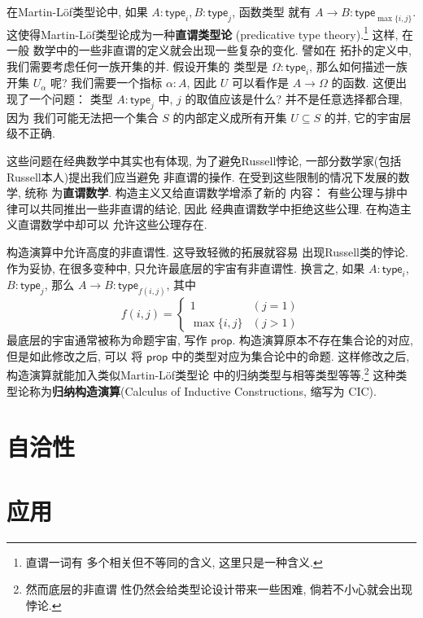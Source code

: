 \documentclass[UTF8]{ctexbook}
\newcommand{\cons}[1]{\textsf{#1}}
\theoremstyle{plain}
\theoremstyle{definition}
\theoremstyle{remark}
\begin{document}
在Martin-L\"of类型论中, 如果
\(A : \cons{type}_i, B : \cons{type}_j\), 函数类型
就有 \(A \to B : \cons{type}_{\max\{i,j\}}\).
这使得Martin-L\"of类型论成为一种\textbf{直谓类型论}
(predicative type theory).\footnote{直谓一词有
多个相关但不等同的含义, 这里只是一种含义.} 这样, 在一般
数学中的一些非直谓的定义就会出现一些复杂的变化. 譬如在
拓扑的定义中, 我们需要考虑任何一族开集的并. 假设开集的
类型是 \(\Omega : \cons{type}_i\), 那么如何描述一族
开集 \(U_\alpha\) 呢? 我们需要一个指标 \(\alpha : A\),
因此 \(U\) 可以看作是 \(A \to \Omega\) 的函数.
这便出现了一个问题： 类型 \(A : \cons{type}_j\) 中,
\(j\) 的取值应该是什么? 并不是任意选择都合理, 因为
我们可能无法把一个集合 \(S\) 的内部定义成所有开集 \(U \subseteq S\)
的并, 它的宇宙层级不正确.

这些问题在经典数学中其实也有体现, 为了避免Russell悖论,
一部分数学家(包括Russell本人)提出我们应当避免
非直谓的操作. 在受到这些限制的情况下发展的数学, 统称
为\textbf{直谓数学}. 构造主义又给直谓数学增添了新的
内容： 有些公理与排中律可以共同推出一些非直谓的结论, 因此
经典直谓数学中拒绝这些公理. 在构造主义直谓数学中却可以
允许这些公理存在.

构造演算中允许高度的非直谓性. 这导致轻微的拓展就容易
出现Russell类的悖论. 作为妥协, 在很多变种中,
只允许最底层的宇宙有非直谓性. 换言之, 如果 \(A : \cons{type}_i\),
\(B : \cons{type}_j\), 那么
\(A \to B : \cons{type}_{f(i,j)}\), 其中
\[f(i,j) = \begin{cases}
1 & (j = 1)\\
\max\{i,j\} & (j > 1)
\end{cases}\]
最底层的宇宙通常被称为命题宇宙, 写作 \(\cons{prop}\).
构造演算原本不存在集合论的对应, 但是如此修改之后, 可以
将 \(\cons{prop}\) 中的类型对应为集合论中的命题.
这样修改之后, 构造演算就能加入类似Martin-L\"of类型论
中的归纳类型与相等类型等等.\footnote{然而底层的非直谓
性仍然会给类型论设计带来一些困难, 倘若不小心就会出现悖论.}
这种类型论称为\textbf{归纳构造演算}(Calculus of Inductive
Constructions, 缩写为 CIC).

\section{自洽性}




\section{应用}
\end{document}
